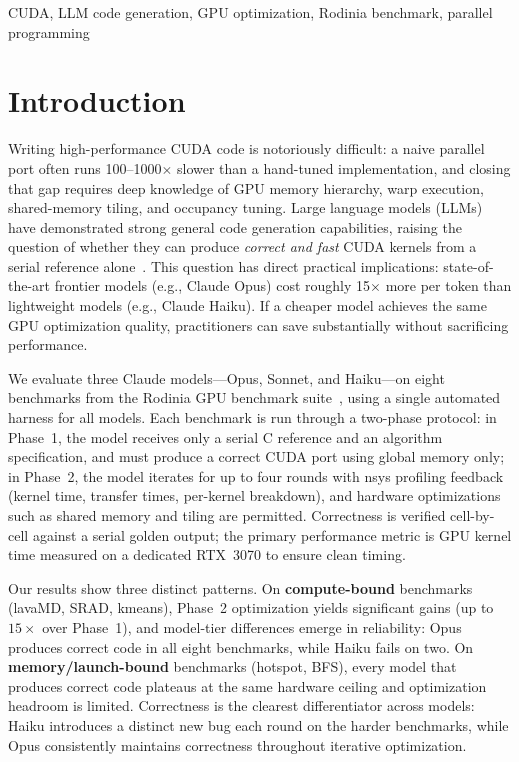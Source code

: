 \documentclass[conference]{IEEEtran}
\begin{document}
\begin{IEEEkeywords}
CUDA, LLM code generation, GPU optimization, Rodinia benchmark, parallel programming
\end{IEEEkeywords}

\vspace{0.5em}
\noindent{}

\section{Introduction}

Writing high-performance CUDA code is notoriously difficult: a naive parallel
port often runs 100--1000$\times$ slower than a hand-tuned implementation, and
closing that gap requires deep knowledge of GPU memory hierarchy, warp execution,
shared-memory tiling, and occupancy tuning. Large language models (LLMs) have
demonstrated strong general code generation capabilities, raising the question of
whether they can produce \emph{correct and fast} CUDA kernels from a serial
reference alone~\cite{chen2021codex}. This question has direct practical implications: state-of-the-art
frontier models (e.g., Claude Opus) cost roughly 15$\times$ more per token than
lightweight models (e.g., Claude Haiku). If a cheaper model achieves the same GPU
optimization quality, practitioners can save substantially without sacrificing
performance.

We evaluate three Claude models---Opus, Sonnet, and Haiku---on eight benchmarks
from the Rodinia GPU benchmark suite~\cite{che2009rodinia}, using a single
automated harness for all models. Each benchmark is run through a two-phase
protocol: in Phase~1, the model receives only a serial C reference and an
algorithm specification, and must produce a correct CUDA port using global memory
only; in Phase~2, the model iterates for up to four rounds with nsys profiling
feedback (kernel time, transfer times, per-kernel breakdown), and hardware
optimizations such as shared memory and tiling are permitted. Correctness is
verified cell-by-cell against a serial golden output; the primary performance
metric is GPU kernel time measured on a dedicated RTX~3070 to ensure clean timing.

Our results show three distinct patterns. On \textbf{compute-bound} benchmarks
(lavaMD, SRAD, kmeans), Phase~2 optimization yields significant gains (up to
$15\times$ over Phase~1), and model-tier differences emerge in reliability: Opus
produces correct code in all eight benchmarks, while Haiku fails on two. On
\textbf{memory/launch-bound} benchmarks (hotspot, BFS), every model that
produces correct code plateaus at the same hardware ceiling and optimization
headroom is limited. Correctness is the clearest differentiator across models:
Haiku introduces a distinct new bug each round on the harder benchmarks, while
Opus consistently maintains correctness throughout iterative optimization.
\end{document}

